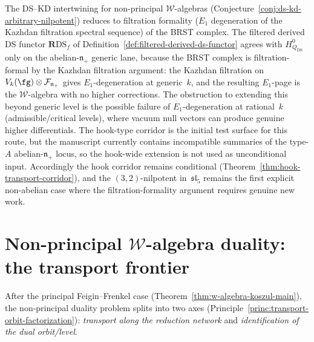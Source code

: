\begin{remark}
\label{rem:ds-kd-formality-route}
The DS--KD intertwining for non-principal
$\mathcal{W}$-algebras
(Conjecture~\ref{conj:ds-kd-arbitrary-nilpotent})
reduces to filtration formality ($E_1$ degeneration of the Kazhdan filtration spectral sequence) of the BRST complex.
The filtered derived DS functor
$\mathbf R\mathrm{DS}_f$ of
Definition~\ref{def:filtered-derived-ds-functor} agrees with
$H^0_{Q_{\mathrm{DS}}}$ only on the abelian-$\mathfrak{n}_+$ generic
lane,
because the BRST complex is filtration-formal by the Kazhdan filtration
argument: the Kazhdan filtration on
$V_k(\fg) \otimes \mathcal{F}_{\mathfrak{n}_+}$ gives
$E_1$-degeneration at generic~$k$, and the resulting
$E_1$-page is the $\mathcal{W}$-algebra with no higher
corrections. The obstruction to extending this beyond generic
level is the possible failure of $E_1$-degeneration at
rational~$k$ (admissible/critical levels), where vacuum null
vectors can produce genuine higher differentials.
The hook-type corridor is the initial test surface for this
route, but the manuscript currently contains incompatible summaries
of the type-$A$ abelian-$\mathfrak{n}_+$ locus, so the hook-wide
extension is not used as unconditional input. Accordingly the
hook corridor remains conditional
(Theorem~\ref{thm:hook-transport-corridor}), and the
$(3,2)$-nilpotent in~$\mathfrak{sl}_5$ remains the first explicit
non-abelian case where the filtration-formality argument requires
genuine new work.
\end{remark}


\section{Non-principal \texorpdfstring{$\mathcal{W}$}{W}-algebra
duality: the transport frontier}
\label{sec:concordance-non-principal-w}

After the principal Feigin--Frenkel case
(Theorem~\ref{thm:w-algebra-koszul-main}), the non-principal
duality problem splits into two axes
(Principle~\ref{princ:transport-orbit-factorization}):
\emph{transport along the reduction network} and
\emph{identification of the dual orbit/level}.

